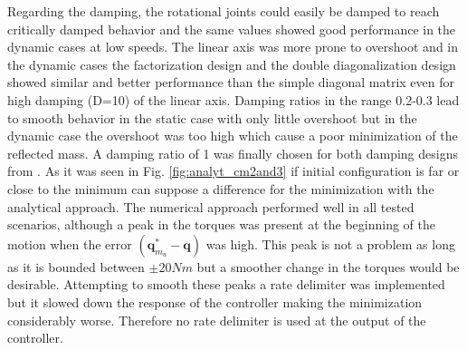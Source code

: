 Regarding the damping, the rotational joints could easily be damped to reach critically damped behavior and the same values showed good performance in the dynamic cases at low speeds. The linear axis was more prone to overshoot and in the dynamic cases the factorization design and the double diagonalization design showed similar and better performance than the simple diagonal matrix even for high damping (D=10) of the linear axis. 
Damping ratios in the range 0.2-0.3 lead to smooth behavior in the static case with only little overshoot but in the dynamic case the overshoot was too high which cause a poor minimization of the reflected mass. A damping ratio of 1 was finally chosen for both damping designs from \cite{alin_damping}.
%
As it was seen in Fig.	\ref{fig:analyt_cm2and3} if initial configuration is far or close to the minimum can suppose a difference for the minimization with the analytical approach. The numerical approach performed well in all tested scenarios, although a peak in the torques was present at the beginning of the motion when the error $(\mathbf{q}_{m_u}^\ast - \mathbf{q})$ was high. This peak is not a problem as long as it is bounded between $\pm 20 Nm$ but a smoother change in the torques would be desirable. Attempting to smooth these peaks a rate delimiter was implemented but it slowed down the response of the controller making the minimization considerably worse. Therefore no rate delimiter is used at the output of the controller.


